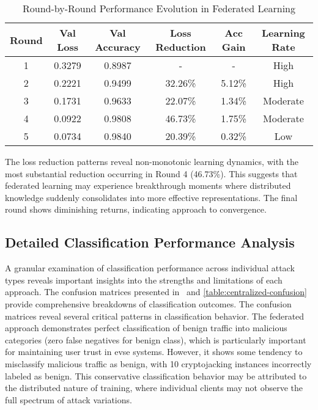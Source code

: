 \begin{table}[H]
	\centering
	\renewcommand{\arraystretch}{1.15}
	\setlength{\tabcolsep}{8pt}
	\caption{Round-by-Round Performance Evolution in Federated Learning}
	\label{tab:federated-evolution}
	\begin{tabular}{@{}cccccc@{}}
		\toprule
		\textbf{Round} & \textbf{Val Loss} & \textbf{Val Accuracy} & \textbf{Loss Reduction} & \textbf{Acc Gain} & \textbf{Learning Rate} \\
		\midrule
		1 & 0.3279 & 0.8987 & - & - & High \\
		2 & 0.2221 & 0.9499 & 32.26\% & 5.12\% & High \\
		3 & 0.1731 & 0.9633 & 22.07\% & 1.34\% & Moderate \\
		4 & 0.0922 & 0.9808 & 46.73\% & 1.75\% & Moderate \\
		5 & 0.0734 & 0.9840 & 20.39\% & 0.32\% & Low \\
		\bottomrule
	\end{tabular}
\end{table}

The loss reduction patterns reveal non-monotonic learning dynamics, with the most substantial reduction occurring in Round 4 (46.73\%). This suggests that federated learning may experience breakthrough moments where distributed knowledge suddenly consolidates into more effective representations. The final round shows diminishing returns, indicating approach to convergence.


\subsection{Detailed Classification Performance Analysis}
A granular examination of classification performance across individual attack types reveals important insights into the strengths and limitations of each approach. The confusion matrices presented in~ and \ref{table:centralized-confusion} provide comprehensive breakdowns of classification outcomes. The confusion matrices reveal several critical patterns in classification behavior. The federated approach demonstrates perfect classification of benign traffic into malicious categories (zero false negatives for benign class), which is particularly important for maintaining user trust in \acrshort{evse} systems. However, it shows some tendency to misclassify malicious traffic as benign, with 10 cryptojacking instances incorrectly labeled as benign. This conservative classification behavior may be attributed to the distributed nature of training, where individual clients may not observe the full spectrum of attack variations. \\

